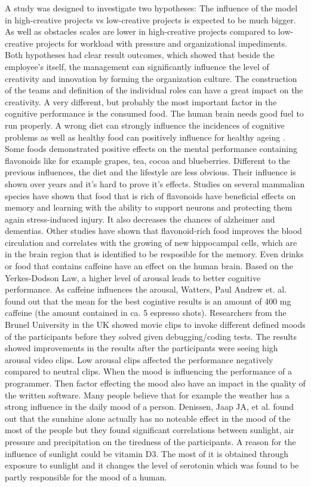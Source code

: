 A study was designed to investigate two hypotheses: The influence of the model in high-creative projects vs low-creative projects is expected to be much bigger. As well as obstacles scales are lower in high-creative projects compared to low-creative projects for workload with pressure and organizational impediments.
Both hypotheses had clear result outcomes, which showed that beside the employee's itself, the management can significantly influence the level of creativity and innovation by forming the organization culture. The construction of the teams and definition of the individual roles can have a great impact on the creativity. 
A very different, but probably the most important factor in the cognitive performance is the consumed food. The human brain needs good fuel to run properly. A wrong diet can strongly influence the incidences of cognitive problems as well as healthy food can positively influence for healthy ageing \cite{spencer2008food}. Some foods demonstrated positive effects on the mental performance containing flavonoids like for example grapes, tea, cocoa and blueberries. 
Different to the previous influences, the diet and the lifestyle are less obvious. Their influence is shown over years and it's hard to prove it's effects.
Studies on several mammalian species have shown that food that is rich of flavonoids have beneficial effects on memory and learning with the ability to support neurons and protecting them again stress-induced injury.
It also decreases the chances of alzheimer and dementias. Other studies have shown that flavonoid-rich food improves the blood circulation and correlates with the growing of new hippocampal cells, which are in the brain region that is identified to be resposible for the memory.
Even drinks or food that contains caffeine have an effect on the human brain.
Based on the Yerkes-Dodson Law, a higher level of arousal leads to better cognitive performance. As caffeine influences the arousal, Watters, Paul Andrew et. al. \cite{watters1997caffeine} found out that the mean for the best cogintive results is an amount of 400 mg caffeine (the amount contained in ca. 5 espresso shots).
Researchers from the Brunel University in the UK showed movie clips to invoke different defined moods of the participants before they solved given debugging/coding tests. The results showed improvements in the results after the participants were seeing high arousal video clips. Low arousal clips affected the performance negatively compared to neutral clips. \cite{khan2007mood}
When the mood is influencing the performance of a programmer. Then factor effecting the mood also have an impact in the quality of the written software. Many people believe that for example the weather has a strong influence in the daily mood of a person. Denissen, Jaap JA, et al. \cite{denissen2008effects} found out that the sunshine alone actually has no noteable effect in the mood of the most of the people but they found significant correlations between sunlight, air pressure and precipitation on the tiredness of the participants.
A reason for the influence of sunlight could be vitamin D3. The most of it is obtained through exposure to sunlight and it changes the level of serotonin which was found to be partly responsible for the mood of a human.
